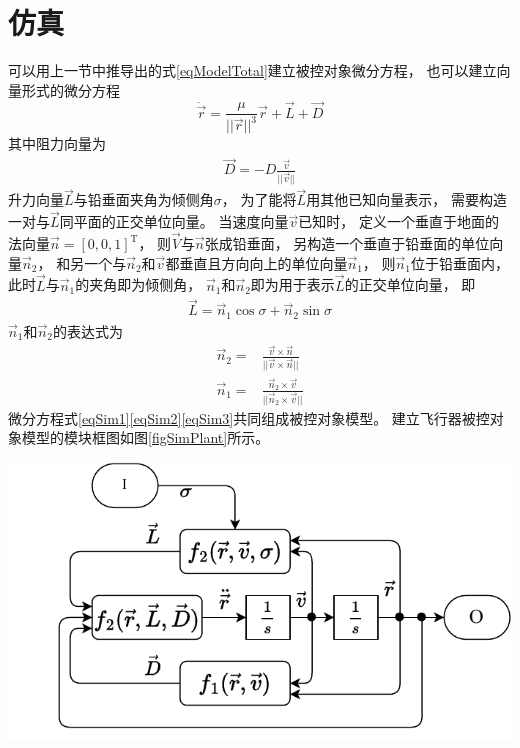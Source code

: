 \section{仿真}
可以用上一节中推导出的式\eqref{eqModelTotal}建立被控对象微分方程，
也可以建立向量形式的微分方程
\begin{equation}
    \ddot{\vec{r}} = \frac{\mu}{||\vec{r}||^3}\vec{r}+\vec{L}+\vec{D} \label{eqSim1}
\end{equation}
其中阻力向量为
\begin{align}
    \vec{D} = -D\frac{\vec{v}}{||\vec{v}||} \label{eqSim2}
\end{align}
升力向量$\vec{L}$与铅垂面夹角为倾侧角$\sigma$，
为了能将$\vec{L}$用其他已知向量表示，
需要构造一对与$\vec{L}$同平面的正交单位向量。
当速度向量$\vec{v}$已知时，
定义一个垂直于地面的法向量$\vec{n}=[0,0,1]^\text{T}$，
则$\vec{V}$与$\vec{n}$张成铅垂面，
另构造一个垂直于铅垂面的单位向量$\vec{n}_2$，
和另一个与$\vec{n}_2$和$\vec{v}$都垂直且方向向上的单位向量$\vec{n}_1$，
则$\vec{n}_1$位于铅垂面内，
此时$\vec{L}$与$\vec{n}_1$的夹角即为倾侧角，
$\vec{n}_1$和$\vec{n}_2$即为用于表示$\vec{L}$的正交单位向量，
即
\begin{align}
    \vec{L}=\vec{n}_1\cos\sigma + \vec{n}_2\sin\sigma \label{eqSim3}
\end{align}
$\vec{n}_1$和$\vec{n}_2$的表达式为
\begin{align*}
    \vec{n}_2 =& \frac{\vec{v}\times\vec{n}}{||\vec{v}\times\vec{n}||} \\
    \vec{n}_1 =& \frac{\vec{n}_2\times\vec{v}}{||\vec{n}_2\times\vec{v}||}
\end{align*}
微分方程式\eqref{eqSim1}\eqref{eqSim2}\eqref{eqSim3}共同组成被控对象模型。
建立飞行器被控对象模型的模块框图如图\ref{figSimPlant}所示。
\begin{center}
	\includegraphics[scale=0.8]{plant.pdf}  \\
	\label{figSimPlant}
\end{center}
